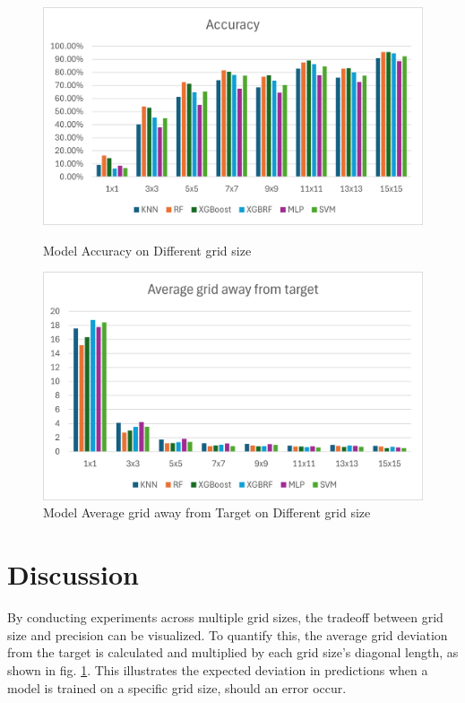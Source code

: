 \documentclass[runningheads]{llncs}
\begin{document}
\vspace{-10pt}
\begin{figure}[hbt!]
	\begin{minipage}{0.45\textwidth}
		\centering
		\includegraphics[scale=0.5]{image3.png}
		\caption{Model Accuracy on Different grid size}
		\label{fig:acc_dgird_size}
	\end{minipage}
	\hfill
	\begin{minipage}{0.45\textwidth}
		\centering
		\includegraphics[scale=0.5]{image1.png}
		\caption{Model Average grid away from Target on Different grid size}
		\label{fig:AGT_dgrid_size}
	\end{minipage}
\end{figure}

\section{Discussion}
By conducting experiments across multiple grid sizes, the tradeoff between grid size and precision can be visualized. To quantify this, the average grid deviation from the target is calculated and multiplied by each grid size's diagonal length, as shown in fig. \ref{fig:AGT_dgrid_size}. This illustrates the expected deviation in predictions when a model is trained on a specific grid size, should an error occur.
\end{document}
